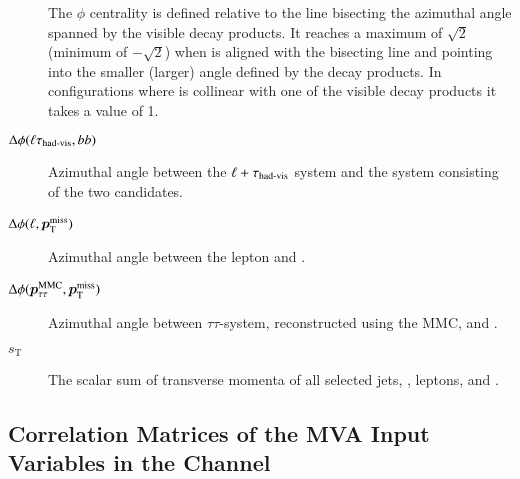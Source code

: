 \begin{description}
  The \pTmiss $\phi$ centrality is defined relative to the line bisecting the
  azimuthal angle spanned by the visible \taulepton decay products. It reaches a
  maximum of $\sqrt{2}$ (minimum of $-\sqrt{2}$) when \pTmiss is aligned with
  the bisecting line and pointing into the smaller (larger) angle defined by the
  decay products. In configurations where \pTmiss is collinear with one of the
  visible \taulepton decay products it takes a value of 1.

\item[$\Delta\phi(\ell\tau_{\text{had-vis}}, bb)$] Azimuthal angle between the
  $\ell + \tau_{\text{had-vis}}$ system and the system consisting of the two \bjet
  candidates.

\item[$\Delta\phi(\ell, \bm{p}_{\text{T}}^{\text{miss}})$] Azimuthal angle between the lepton and
  \pTmiss.

\item[$\Delta\phi(\bm{p}_{\tau\tau}^\text{MMC}, \bm{p}_{\text{T}}^{\text{miss}})$] Azimuthal angle between
  $\tau\tau$-system, reconstructed using the MMC, and \pTmiss.

\item[$s_{\text{T}}$] The scalar sum of transverse momenta of all selected jets,
  \tauhadvis, leptons, and \pTmissAbs.

\end{description}


\clearpage
\subsection{Correlation Matrices of the MVA Input Variables in the \hadhad
  Channel}

